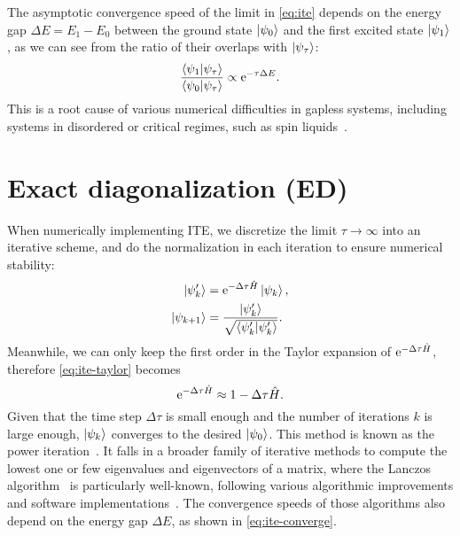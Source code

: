 The asymptotic convergence speed of the limit in \cref{eq:ite} depends on the energy gap $\Delta E = E_1 - E_0$ between the ground state $\ket{\psi_0}$ and the first excited state $\ket{\psi_1}$, as we can see from the ratio of their overlaps with $\ket{\psi_\tau}$:
\begin{equation}
\frac{\ip{\psi_1}{\psi_\tau}}{\ip{\psi_0}{\psi_\tau}} \propto \rme^{-\tau \Delta E}. \label{eq:ite-converge}
\end{equation}
This is a root cause of various numerical difficulties in gapless systems, including systems in disordered or critical regimes, such as spin liquids~\cite{misguich2010quantum, balents2010spin, mila2015frustrated}.

\section{Exact diagonalization (ED)}
\label{sec:ed}

When numerically implementing ITE, we discretize the limit $\tau \to \infty$ into an iterative scheme, and do the normalization in each iteration to ensure numerical stability:
\begin{align}
\ket{\psi'_k} &= \rme^{-\Delta \tau \hat{H}} \ket{\psi_k}, \\
\ket{\psi_{k + 1}} &= \frac{\ket{\psi'_k}}{\sqrt{\ip{\psi'_k}}}.
\end{align}
Meanwhile, we can only keep the first order in the Taylor expansion of $\mathrm{e}^{-\Delta \tau \hat{H}}$, therefore \cref{eq:ite-taylor} becomes
\begin{equation}
\mathrm{e}^{-\Delta \tau \hat{H}} \approx 1 - \Delta \tau \hat{H}.
\end{equation}
Given that the time step $\Delta \tau$ is small enough and the number of iterations $k$ is large enough, $\ket{\psi_k}$ converges to the desired $\ket{\psi_0}$. This method is known as the power iteration~\cite{mises1929praktische}. It falls in a broader family of iterative methods to compute the lowest one or few eigenvalues and eigenvectors of a matrix, where the Lanczos algorithm~\cite{lanczos1950iteration} is particularly well-known, following various algorithmic improvements and software implementations~\cite{knyazev2001toward, stathopoulos2010primme}. The convergence speeds of those algorithms also depend on the energy gap $\Delta E$, as shown in \cref{eq:ite-converge}.

